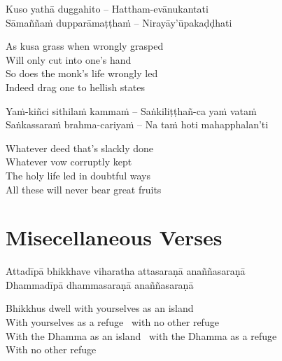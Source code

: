 \begin{twochants}
  Kuso yathā duggahito – Hattham-evānukantati\\
  Sāmaññaṁ dupparāmaṭṭhaṁ – Nirayāy’ūpakaḍḍhati\\
\end{twochants}

\begin{english}
  As kusa grass when wrongly grasped\\
  Will only cut into one’s hand\\
  So does the monk’s life wrongly led\\
  Indeed drag one to hellish states
\end{english}

\begin{twochants}
  Yaṁ-kiñci sithilaṁ kammaṁ – Saṅkiliṭṭhañ-ca yaṁ vataṁ\\
  Saṅkassaraṁ brahma-cariyaṁ – Na taṁ hoti mahapphalan’ti\\
\end{twochants}

\begin{english}
  Whatever deed that’s slackly done\\
  Whatever vow corruptly kept\\
  The holy life led in doubtful ways\\
  All these will never bear great fruits
\end{english}

\suttaRef{[SN 2.8]}


\section{Misecellaneous Verses}
\label{misc-verses}

\begin{leader}
\end{leader}

\begin{twochants}
  Attadīpā bhikkhave viharatha attasaraṇā anaññasaraṇā\\
  Dhammadīpā dhammasaraṇā anaññasaraṇā\\
\end{twochants}

\begin{english}
  Bhikkhus dwell with yourselves as an island\\
  With yourselves as a refuge \breathmark\ with no other refuge\\
  With the Dhamma as an island \breathmark\ with the Dhamma as a refuge\\
  With no other refuge
\end{english}

